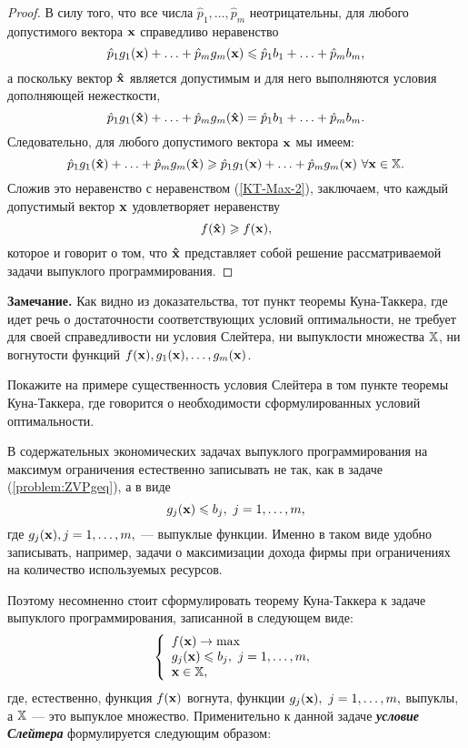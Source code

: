 \begin{proof}
    В силу того, что все числа $\hat{p}_{1},\ldots,\hat{p}_{m}$
    неотрицательны, для любого допустимого вектора $\mathbf{x}$
    справедливо неравенство
\[
    \hat{p}_1 g_1(\mathbf{x})+ \ldots + \hat{p}_m g_m(\mathbf{x})
    \leqslant \hat{p}_1 b_{1}+\ldots+\hat{p}_m b_m,
\]
    а поскольку вектор $\mathbf{\hat{x}}$ является допустимым и для него
    выполняются условия дополняющей нежесткости,
\[
    \hat{p}_1 g_1(\mathbf{\hat{x}})+ \ldots + \hat{p}_m g_m(\mathbf{\hat{x}})
    =\hat{p}_1 b_{1}+\ldots+\hat{p}_m b_m.
\]
    Следовательно, для любого допустимого вектора $\mathbf{x}$ мы имеем:
\[
    \hat{p}_1 g_1(\mathbf{\hat{x}})+ \ldots + \hat{p}_m g_m(\mathbf{\hat{x}})\geqslant
    \hat{p}_1 g_1(\mathbf{x})+ \ldots + \hat{p}_m g_m(\mathbf{x})
    \ \forall\mathbf{x} \in \mathbb{X}.
\]
    Сложив это неравенство с неравенством (\ref{KT-Max-2}),
    заключаем, что каждый допустимый вектор $\mathbf{x}$ удовлетворяет
    неравенству
\[
    f(\mathbf{\hat{x}})\geqslant f(\mathbf{x}),
\]
    которое и говорит о том, что $\mathbf{\hat{x}}$ представляет собой
    решение рассматриваемой задачи выпуклого программирования.
\end{proof}

    \textbf{Замечание.} Как видно из доказательства, тот пункт
    теоремы Куна-Таккера, где идет речь о достаточности соответствующих условий
    оптимальности, не требует для своей справедливости ни
     условия Слейтера, ни выпуклости множества $\mathbb{X}$, ни
     вогнутости функций $f(\mathbf{x}), g_1(\mathbf{x}), \ldots, g_m(\mathbf{x})$.


\begin{exer}
Покажите на примере существенность условия Слейтера в том пункте
теоремы Куна-Таккера, где говорится о необходимости сформулированных
условий оптимальности.
\end{exer}


    В содержательных экономических задачах выпуклого
    программирования на максимум ограничения естественно записывать
    не так, как в задаче (\ref{problem:ZVPgeq}), а в виде
\[
    g_j (\vc{x}) \leqslant b_j, \ j=1,\ldots,m,
\]
    где $g_j (\mathbf{x}), j=1,\ldots,m,$ --- выпуклые функции. Именно в
    таком виде удобно записывать, например, задачи о максимизации
    дохода фирмы при ограничениях на количество используемых
    ресурсов.

    Поэтому несомненно стоит сформулировать теорему Куна-Таккера к
    задаче выпуклого программирования, записанной в следующем виде:
\begin{equation}\label{problem:ZVPleq}
    \left\{ \begin{array}{l}
         f(\mathbf{x}) \to \max  \\
        g_j (\mathbf{x}) \leqslant b_j, \ j = 1,\ldots,m,\\
        \mathbf{x} \in \mathbb{X}, \\
  \end{array} \right.
\end{equation}
    где, естественно, функция $f(\mathbf{x})$ вогнута, функции
    $g_j (\mathbf{x}), \ j=1,\ldots,m,$ выпуклы, а $\mathbb{X}$ --- это выпуклое
    множество. Применительно к данной задаче \emph{\textbf{условие
    Слейтера}} формулируется следующим образом:

